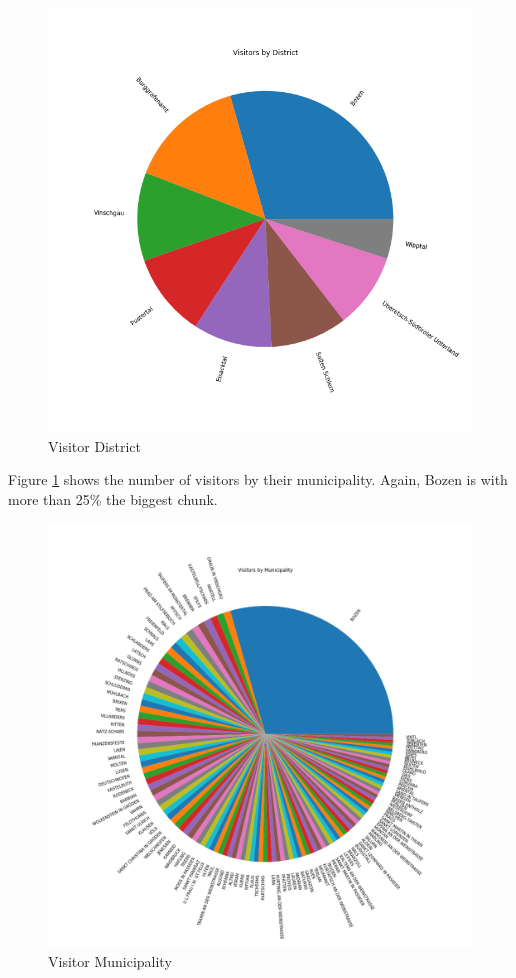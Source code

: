 \documentclass[letterpaper,12pt]{article}
\begin{document}
\begin{figure}[H] 
        \centering
        \includegraphics[width=\columnwidth]{../images/district.png}
        \caption{
                \label{fig:district}  
                Visitor District
        }
\end{figure}

Figure \ref{fig:district} shows the number of visitors by their municipality. Again, Bozen is with more than 25\% the biggest chunk.

\begin{figure}[H] 
        \centering
        \includegraphics[width=\columnwidth]{../images/municipality.png}
        \caption{
                \label{fig:municipality}  
                Visitor Municipality
        }
\end{figure}
\end{document}
